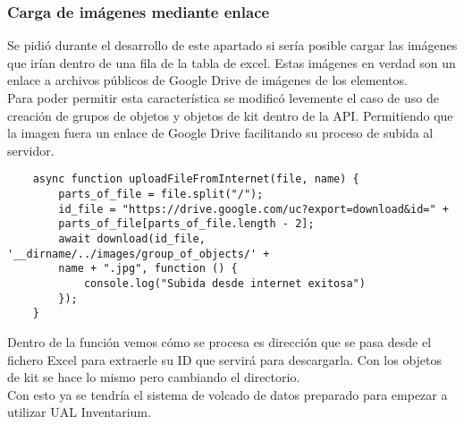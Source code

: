 \subsubsection{Carga de imágenes mediante enlace}
Se pidió durante el desarrollo de este apartado si sería posible cargar las imágenes que irían dentro de una fila de la tabla de excel. Estas imágenes en verdad son un enlace a archivos públicos de Google Drive de imágenes de los elementos.
\\Para poder permitir esta característica se modificó levemente el caso de uso de creación de grupos de objetos y objetos de kit dentro de la API. Permitiendo que la imagen fuera un enlace de Google Drive facilitando su proceso de subida al servidor.
\begin{verbatim}
    async function uploadFileFromInternet(file, name) {
        parts_of_file = file.split("/");
        id_file = "https://drive.google.com/uc?export=download&id=" + 
        parts_of_file[parts_of_file.length - 2];
        await download(id_file, '__dirname/../images/group_of_objects/' + 
        name + ".jpg", function () { 
            console.log("Subida desde internet exitosa") 
        });
    }
\end{verbatim}
Dentro de la función vemos cómo se procesa es dirección que se pasa desde el fichero Excel para extraerle su ID que servirá para descargarla. Con los objetos de kit se hace lo mismo pero cambiando el directorio.
\\Con esto ya se tendría el sistema de volcado de datos preparado para empezar a utilizar UAL Inventarium.
